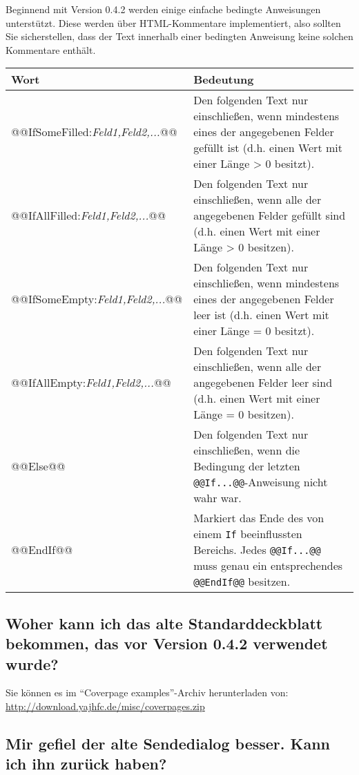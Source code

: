 \documentclass[a4paper,10pt,halfparskip,noparindent]{scrartcl}
\begin{document}
Beginnend mit Version 0.4.2 werden einige einfache bedingte Anweisungen unterstützt. Diese werden über HTML-Kommentare implementiert, also sollten Sie sicherstellen, dass der Text innerhalb einer bedingten Anweisung keine solchen Kommentare enthält.
\begin{center}
\begin{tabular}{|l|p{}|}
\hline
\bfseries Wort & \bfseries Bedeutung \\
\hline\hline
\ttfamily @@IfSomeFilled:\textit{Feld1,Feld2,...}@@ & Den folgenden Text nur einschließen, wenn mindestens eines der angegebenen Felder gefüllt ist (d.h. einen Wert mit einer Länge > 0 besitzt).\\\hline
\ttfamily @@IfAllFilled:\textit{Feld1,Feld2,...}@@ & Den folgenden Text nur einschließen, wenn alle der angegebenen Felder gefüllt sind (d.h. einen Wert mit einer Länge > 0 besitzen).\\\hline
\ttfamily @@IfSomeEmpty:\textit{Feld1,Feld2,...}@@ & Den folgenden Text nur einschließen, wenn mindestens eines der angegebenen Felder leer ist (d.h. einen Wert mit einer Länge = 0 besitzt).\\\hline
\ttfamily @@IfAllEmpty:\textit{Feld1,Feld2,...}@@ & Den folgenden Text nur einschließen, wenn alle der angegebenen Felder leer sind (d.h. einen Wert mit einer Länge = 0 besitzen).\\\hline
\ttfamily @@Else@@ & Den folgenden Text nur einschließen, wenn die Bedingung der letzten \texttt{@@If...@@}-Anweisung nicht wahr war.\\\hline
\ttfamily @@EndIf@@ & Markiert das Ende des von einem \texttt{If} beeinflussten Bereichs. Jedes \texttt{@@If...@@} muss genau ein entsprechendes \texttt{@@EndIf@@} besitzen.\\\hline
\end{tabular}
\end{center}

\subsection{Woher kann ich das alte Standarddeckblatt bekommen, das vor Version 0.4.2 verwendet wurde?}

Sie können es im "`Coverpage examples"'-Archiv herunterladen von: \url{http://download.yajhfc.de/misc/coverpages.zip}


\subsection{Mir gefiel der alte Sendedialog besser. Kann ich ihn zurück haben?}
\end{document}
